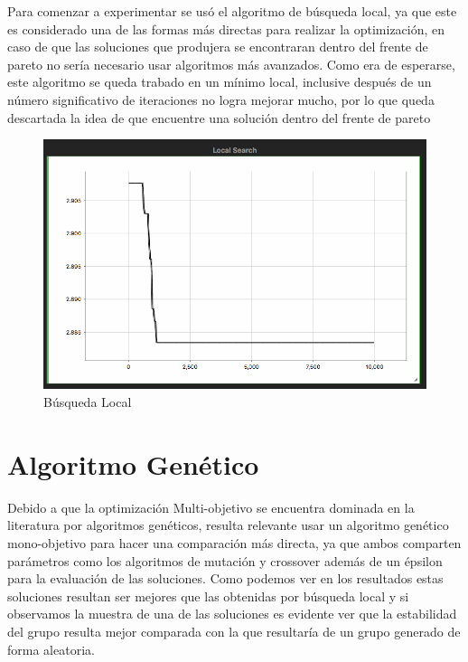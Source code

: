 Para comenzar a experimentar se usó el algoritmo de búsqueda local, ya que este es considerado una de las formas más directas para realizar la optimización, en caso de que las soluciones que produjera se encontraran dentro del frente de pareto no sería necesario usar algoritmos más avanzados. Como era de esperarse, este algoritmo se queda trabado en un mínimo local, inclusive después de un número significativo de iteraciones no logra mejorar mucho, por lo que queda descartada la idea de que encuentre una solución dentro del frente de pareto

\begin{figure}
    \centering
    \includegraphics[width=150mm]{Local.png}
    \caption{Búsqueda Local}
    \label{fig:local}
\end{figure}

\section{Algoritmo Genético}

Debido a que la optimización Multi-objetivo se encuentra dominada en la literatura por algoritmos genéticos, resulta relevante usar un algoritmo genético mono-objetivo para hacer una comparación más directa, ya que ambos comparten parámetros como los algoritmos de mutación y crossover además de un épsilon para la evaluación de las soluciones. Como podemos ver en los resultados estas soluciones resultan ser mejores que las obtenidas por búsqueda local y si observamos la muestra de una de las soluciones es evidente ver que la estabilidad del grupo resulta mejor comparada con la que resultaría de un grupo generado de forma aleatoria.

